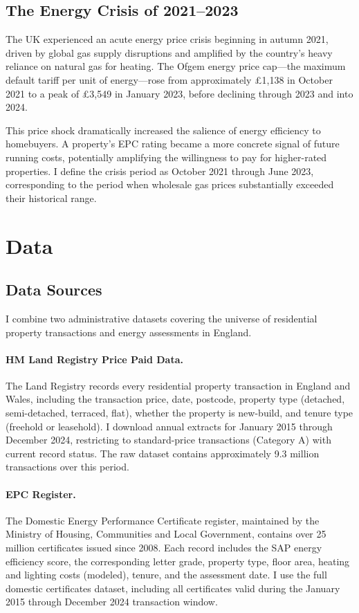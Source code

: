 \documentclass[12pt]{article}
\begin{document}
\subsection{The Energy Crisis of 2021--2023}

The UK experienced an acute energy price crisis beginning in autumn 2021, driven by global gas supply disruptions and amplified by the country's heavy reliance on natural gas for heating. The Ofgem energy price cap---the maximum default tariff per unit of energy---rose from approximately \pounds 1,138 in October 2021 to a peak of \pounds 3,549 in January 2023, before declining through 2023 and into 2024.

This price shock dramatically increased the salience of energy efficiency to homebuyers. A property's EPC rating became a more concrete signal of future running costs, potentially amplifying the willingness to pay for higher-rated properties. I define the crisis period as October 2021 through June 2023, corresponding to the period when wholesale gas prices substantially exceeded their historical range.


\section{Data}\label{sec:data}

\subsection{Data Sources}

I combine two administrative datasets covering the universe of residential property transactions and energy assessments in England.

\paragraph{HM Land Registry Price Paid Data.} The Land Registry records every residential property transaction in England and Wales, including the transaction price, date, postcode, property type (detached, semi-detached, terraced, flat), whether the property is new-build, and tenure type (freehold or leasehold). I download annual extracts for January 2015 through December 2024, restricting to standard-price transactions (Category A) with current record status. The raw dataset contains approximately 9.3 million transactions over this period.

\paragraph{EPC Register.} The Domestic Energy Performance Certificate register, maintained by the Ministry of Housing, Communities and Local Government, contains over 25 million certificates issued since 2008. Each record includes the SAP energy efficiency score, the corresponding letter grade, property type, floor area, heating and lighting costs (modeled), tenure, and the assessment date. I use the full domestic certificates dataset, including all certificates valid during the January 2015 through December 2024 transaction window.
\end{document}
